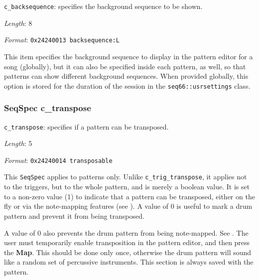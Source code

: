   \begin{description}
      \item \texttt{c\_backsequence}:
         specifies the background sequence to be shown.
      \item \textsl{Length}: 8
      \item \textsl{Format}: \texttt{0x24240013 backsequence:L}
   \end{description}

   This item specifies the background sequence to display in the pattern
   editor for a song (globally), but it
   can also be specified inside each pattern, as well, so that patterns
   can show different background sequences.
   When provided globally, this option is stored for the duration
   of the session in the
   \texttt{seq66::usrsettings} class.

\subsubsection{SeqSpec c\_transpose}
\label{subsubsec:midi_format_track_seqspec_transpose}

   \begin{description}
      \item \texttt{c\_transpose}: specifies if a pattern can be transposed.
      \item \textsl{Length}: 5
      \item \textsl{Format}: \texttt{0x24240014 transposable}
   \end{description}

   This
   \texttt{SeqSpec} applies to patterns only.
   Unlike \texttt{c\_trig\_transpose}, it applies not to the triggers, but
   to the whole pattern, and is merely a boolean value.
   It is set to a non-zero value (1) to indicate
   that a pattern can be transposed, either on the fly or via the
   note-mapping features (see ).
   A value of 0 is useful to mark a drum pattern and prevent it from being
   transposed.

   A value of 0 also prevents the drum pattern from being note-mapped.
   See .
   The user must temporarily enable transposition in the pattern editor, and
   then press the \textbf{Map}.  This should be done only once, otherwise the
   drum pattern will sound like a random set of percussive instruments.
   This section is always saved with the pattern.

